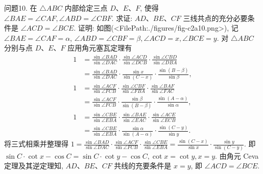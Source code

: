 问题10. 在 $\triangle A B C$ 内部给定三点 $D 、 E 、 F$, 使得 $\angle B A E=\angle C A F, \angle A B D= \angle C B F$. 求证: $A D 、 B E 、 C F$ 三线共点的充分必要条件是 $\angle A C D= \angle B C E$.
证明: 如图(<FilePath:./figures/fig-c2a10.png>), 记 $\angle B A E=\angle C A F=\alpha$, $\angle A B D=\angle C B F=\beta, \angle A C D=x, \angle B C E=y$. 对 $\triangle A B C$ 分别与点 $D 、 E 、 F$ 应用角元塞瓦定理有
$$
\begin{aligned}
1 & =\frac{\sin \angle B A D}{\sin \angle D A C} \cdot \frac{\sin \angle A C D}{\sin \angle D C B} \cdot \frac{\sin \angle C B D}{\sin \angle D B A} \\
& =\frac{\sin \angle B A D}{\sin \angle D A C} \cdot \frac{\sin x}{\sin (C-x)} \cdot \frac{\sin (B-\beta)}{\sin \beta}, \\
1 & =\frac{\sin \angle A C F}{\sin \angle F C B} \cdot \frac{\sin \angle C B F}{\sin \angle F B A} \cdot \frac{\sin \angle B A F}{\sin \angle F A C} \\
& =\frac{\sin \angle A C F}{\sin \angle F C B} \cdot \frac{\sin \beta}{\sin (B-\beta)} \cdot \frac{\sin (A-\alpha)}{\sin \alpha}, \\
1 & =\frac{\sin \angle C B E}{\sin \angle E B A} \cdot \frac{\sin \angle B A E}{\sin \angle E A C} \cdot \frac{\sin \angle A C E}{\sin \angle E C B} \\
& =\frac{\sin \angle C B E}{\sin \angle E B A} \cdot \frac{\sin \alpha}{\sin (A-\alpha)} \cdot \frac{\sin (C-y)}{\sin y} .
\end{aligned}
$$
将三式相乘并整理得
$1=\frac{\sin \angle B A D}{\sin \angle D A C} \cdot \frac{\sin \angle A C F}{\sin \angle F C B} \cdot \frac{\sin \angle C B E}{\sin \angle E B A}=\frac{\sin (C-x)}{\sin x} \cdot \frac{\sin y}{\sin (C-y)}$.
即 $\sin C \cdot \cot x-\cos C=\sin C \cdot \cot y-\cos C, \cot x=\cot y, x=y$.
由角元 Ceva 定理及其逆定理知, $A D 、 B E 、 C F$ 共线的充要条件是 $x= y$, 即 $\angle A C D=\angle B C E$.




